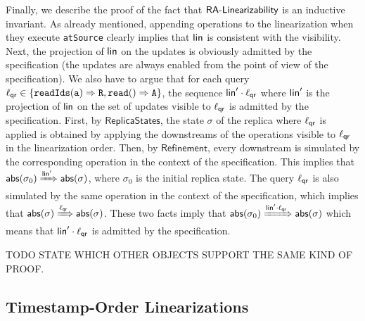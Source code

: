 Finally, we describe the proof of the fact that $\mathsf{RA\text{-}Linearizability{}}$ is an inductive invariant. As already mentioned, appending operations to the linearization when they execute \lstinline|atSource| clearly implies that $\mathsf{lin}$ is consistent with the visibility. Next, the projection of $\mathsf{lin}$ on the updates is obviously admitted by the specification (the updates are always enabled from the point of view of the specification).
We also have to argue that for each query $\alabel_{\mathsf{qr}}\in\{\alabellongind[{\tt readIds}]{a}{R}{},\alabellongind[{\tt read}]{}{A}{}\}$, the sequence $\mathsf{lin}'\cdot \ell_{\mathsf{qr}}$ where $\mathsf{lin}'$ is the projection of $\mathsf{lin}$ on the set of updates
visible to $\ell_{\mathsf{qr}}$ is admitted by the specification. First, by $\mathsf{ReplicaStates}$, the state $\sigma$ of the replica where $\ell_{\mathsf{qr}}$ is applied is obtained by applying the downstreams of the operations visible to $\ell_{\mathsf{qr}}$ in the linearization order. Then, by $\mathsf{Refinement}$, every downstream is simulated by the corresponding operation in the context of the specification. This implies that $\mathsf{abs}(\sigma_0)\xRightarrow{\ensuremath{\mathsf{lin}}'}\mathsf{abs}(\sigma)$, where $\sigma_0$ is the initial replica state. The query $\ell_{\mathsf{qr}}$ is also simulated by the same operation in the context of the specification, which implies that $\mathsf{abs}(\sigma)\xRightarrow{\ensuremath{\ell}_{\mathsf{qr}}}\mathsf{abs}(\sigma)$. These two facts imply that $\mathsf{abs}(\sigma_0)\xRightarrow{\ensuremath{\mathsf{lin}}'\cdot \ensuremath{\ell}_{\mathsf{qr}}}\mathsf{abs}(\sigma)$ which means that $\mathsf{lin}'\cdot \ell_{\mathsf{qr}}$ is admitted by the specification.

TODO STATE WHICH OTHER OBJECTS SUPPORT THE SAME KIND OF PROOF.

\subsection{Timestamp-Order Linearizations}
\label{subsec:time-stamp order as linearizabtion}

